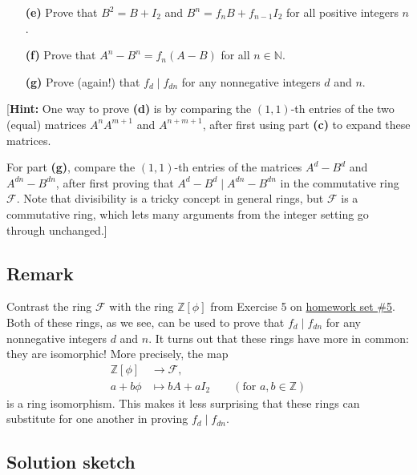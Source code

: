 \documentclass[paper=a4, fontsize=12pt]{scrartcl}%
\theoremstyle{plainsl}
\theoremstyle{definition}
\theoremstyle{remark}
\begin{document}
\begin{enumerate}
\item[\textbf{(e)}] Prove that $B^{2} = B + I_{2}$ and $B^{n} = f_{n} B +
f_{n-1} I_{2}$ for all positive integers $n$.

\item[\textbf{(f)}] Prove that $A^{n} - B^{n} = f_{n} \left(  A - B \right)  $
for all $n \in\mathbb{N}$.

\item[\textbf{(g)}] Prove (again!) that $f_{d}\mid f_{dn}$ for any nonnegative
integers $d$ and $n$.
\end{enumerate}

[\textbf{Hint:} One way to prove \textbf{(d)} is by comparing the $\left(  1,
1 \right)  $-th entries of the two (equal) matrices $A^{n} A^{m+1}$ and
$A^{n+m+1}$, after first using part \textbf{(c)} to expand these matrices.

For part \textbf{(g)}, compare the $\left(  1, 1 \right)  $-th entries of the
matrices $A^{d} - B^{d}$ and $A^{dn} - B^{dn}$, after first proving that
$A^{d} - B^{d} \mid A^{dn} - B^{dn}$ in the commutative ring $\mathcal{F}$.
Note that divisibility is a tricky concept in general rings, but $\mathcal{F}$
is a commutative ring, which lets many arguments from the integer setting go
through unchanged.]

\subsection{Remark}

Contrast the ring $\mathcal{F}$ with the ring $\mathbb{Z}\left[  \phi\right]
$ from Exercise 5 on
\href{http://www.cip.ifi.lmu.de/~grinberg/t/19s/hw5s.pdf}{homework set \#5}.
Both of these rings, as we see, can be used to prove that $f_{d}\mid f_{dn}$
for any nonnegative integers $d$ and $n$. It turns out that these rings have
more in common: they are isomorphic! More precisely, the map%
\begin{align*}
\mathbb{Z}\left[  \phi\right]   &  \rightarrow\mathcal{F},\\
a+b\phi &  \mapsto bA+aI_{2}\qquad\left(  \text{for }a,b\in\mathbb{Z}\right)
\end{align*}
is a ring isomorphism. This makes it less surprising that these rings can
substitute for one another in proving $f_{d}\mid f_{dn}$.

\subsection{Solution sketch}
\end{document}
